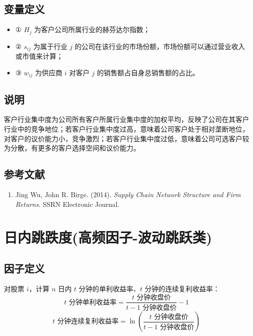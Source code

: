\documentclass{article}
\begin{document}
\subsection{变量定义}
\begin{itemize}
    \item ① \( H_j \) 为客户公司所属行业的赫芬达尔指数；
    \item ② \( s_{ij} \) 为属于行业 \( j \) 的公司在该行业的市场份额，市场份额可以通过营业收入或市值来计算；
    \item ③ \( w_{ij} \) 为供应商 \( i \) 对客户 \( j \) 的销售额占自身总销售额的占比。
\end{itemize}

\subsection{说明}
客户行业集中度为公司所有客户所属行业集中度的加权平均，反映了公司在其客户行业中的竞争地位；若客户行业集中度过高，意味着公司客户处于相对垄断地位，对客户的议价能力小，竞争激烈；若客户行业集中度过低，意味着公司可选客户较为分散，有更多的客户选择空间和议价能力。

\subsection{参考文献}
\begin{enumerate}
    \item Jing Wu, John R. Birge. (2014). \textit{Supply Chain Network Structure and Firm Returns}. SSRN Electronic Journal.
\end{enumerate}

\section{日内跳跌度(高频因子-波动跳跃类)}

\subsection{因子定义}
对股票 \( i \)，计算 \( n \) 日内 \( t \) 分钟的单利收益率、\( t \) 分钟的连续复利收益率：
\begin{equation}
    t \text{ 分钟单利收益率} = \frac{t \text{ 分钟收盘价}}{t-1 \text{ 分钟收盘价}} - 1
\end{equation}
\begin{equation}
    t \text{ 分钟连续复利收益率} = \ln\left(\frac{t \text{ 分钟收盘价}}{t-1 \text{ 分钟收盘价}}\right)
\end{equation}
\end{document}
